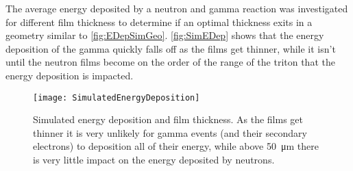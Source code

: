 
The average energy deposited by a neutron and gamma reaction was investigated for different film thickness to determine if an optimal thickness exits in a geometry similar to \autoref{fig:EDepSimGeo}.
\autoref{fig:SimEDep} shows that the energy deposition of the gamma quickly falls off as the films get thinner, while it isn't until the neutron films become on the order of the range of the triton that the energy deposition is impacted.
\begin{figure}
  \centering
  \texttt{[image: SimulatedEnergyDeposition]}
  \caption[Simulated Energy Deposition and Film Thickness]{Simulated energy deposition and film thickness. As the films get thinner it is very unlikely for gamma events (and their secondary electrons) to deposition all of their energy, while above \SI{50}{\um} there is very little impact on the energy deposited by neutrons.\EnergyDepSimGeo}
  \label{fig:SimEDep}
\end{figure}

